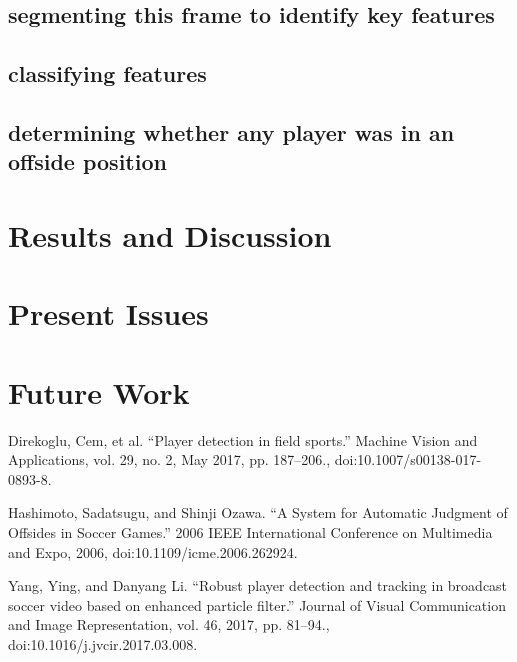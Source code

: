 \documentclass[letterpaper, 10 pt, conference]{ieeeconf}  %
\begin{document}
\subsection{segmenting this frame to identify key features}

\subsection{classifying features}

\subsection{determining whether any player was in an offside position}

\section{Results and Discussion}

\section{Present Issues}

\section{Future Work}

\addtolength{\textheight}{-12cm}   %


\begin{thebibliography}{99}

 Direkoglu, Cem, et al. “Player detection in field sports.” Machine Vision and 
Applications, vol. 29, no. 2, May 2017, pp. 187–206., doi:10.1007/s00138-017-0893-8.

Hashimoto, Sadatsugu, and Shinji Ozawa. “A System for Automatic Judgment of 
Offsides in Soccer Games.” 2006 IEEE International Conference on Multimedia and Expo, 2006, doi:10.1109/icme.2006.262924.

Yang, Ying, and Danyang Li. “Robust player detection and tracking in broadcast 
soccer video based on enhanced particle filter.” Journal of Visual 
Communication and Image Representation, vol. 46, 2017, pp. 81–94., doi:10.1016/j.jvcir.2017.03.008.

\end{thebibliography}
\end{document}
